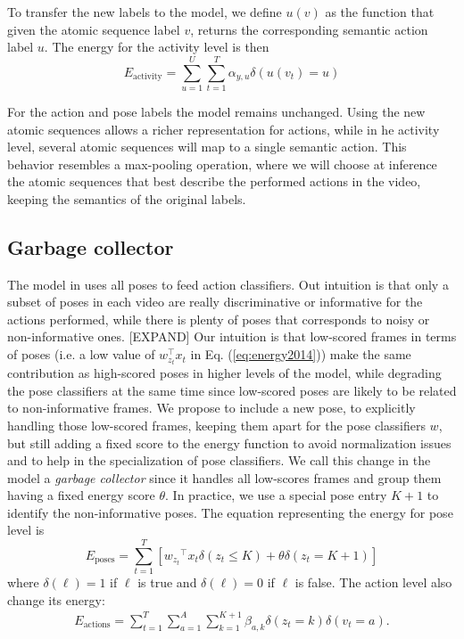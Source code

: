 To transfer the new labels to the model, we define $u(v)$ as the function that 
given the atomic sequence label $v$, returns the corresponding semantic action 
label $u$. The energy for the activity level is then
\begin{equation}
E_{\text{activity}} =  \sum_{u=1}^U\sum_{t=1}^T \alpha_{y,u}\delta(u(v_t)=u)
\end{equation}  

For the action and pose labels the model remains unchanged. Using the new atomic 
sequences allows a richer representation for actions, while in he activity 
level, several atomic sequences will map to a single semantic action. This 
behavior resembles a max-pooling operation, where we will choose at inference 
the atomic sequences that best describe the performed actions in the video, 
keeping the semantics of the original labels. 

\subsection{Garbage collector}

The model in \cite{Lillo2014} uses all poses to feed action classifiers. Out 
intuition is that only a subset of poses in each video are really discriminative 
or informative for the actions performed, while there is plenty of poses that 
corresponds to noisy or non-informative ones. [EXPAND] Our intuition is that 
low-scored frames in terms of poses (i.e. a low value of $w_{z_t}^\top x_t$ in 
Eq. (\ref{eq:energy2014})) make the same contribution as high-scored poses in 
higher levels of the model, while degrading the pose classifiers at the same 
time since low-scored poses are likely to be related to non-informative frames. 
We propose to include a new pose, to explicitly handling those low-scored 
frames, keeping them apart for the pose classifiers $w$, but still adding a 
fixed score to the energy function to avoid normalization issues and to help in 
the specialization of pose classifiers. We call this change in the model a 
\emph{garbage collector} since it handles all low-scores frames and group them 
having a fixed energy score $\theta$. In practice, we use a special pose entry 
$K+1$ to identify the non-informative poses. The equation representing the 
energy for pose level is
%
\begin{equation} \label{Eq_poseEnergy}
E_{\text{poses}}  = \sum_{t=1}^T \left[  {w_{z_t}}^\top x_{t}\delta(z_{t} \le  
K) + \theta 
\delta(z_{t}=K+1)\right] 
\end{equation}
where $\delta(\ell) = 1$ if $\ell$ is true and $\delta(\ell) = 0$ if
$\ell$ is false. The action level also change its energy:
\begin{equation}
\begin{split}
 \label{Eq_actionEnergy}
E_{\text{actions}} =  \sum_{t=1}^T \sum_{a=1}^A \sum_{k=1}^{K+1}  \beta_{a,k} 
\delta(z_t = k) \delta(v_t = a).
\end{split}
\end{equation}





 






